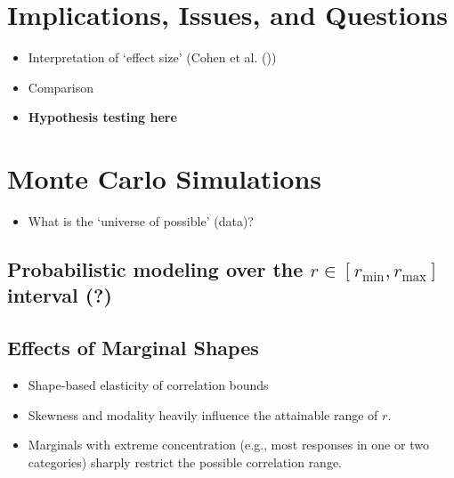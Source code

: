 \documentclass[
  12pt,
]{article}
\providecommand{\tightlist}{%
  \setlength{\itemsep}{0pt}\setlength{\parskip}{0pt}}\usepackage{longtable,booktabs,array}
\theoremstyle{plain}
\theoremstyle{definition}
\theoremstyle{remark}
\begin{document}
\section{Implications, Issues, and
Questions}\label{implications-issues-and-questions}

\begin{itemize}
\tightlist
\item
  Interpretation of `effect size' (Cohen et al.
  ())
\item
  Comparison
\item
  \textbf{Hypothesis testing here}
\end{itemize}

\section{Monte Carlo Simulations}\label{monte-carlo-simulations}

\begin{itemize}
\tightlist
\item
  What is the `universe of possible' (data)?
\end{itemize}

\subsection{\texorpdfstring{Probabilistic modeling over the
\(r \in [r_{\min}, r_{\max}]\) interval
(?)}{Probabilistic modeling over the r \textbackslash in {[}r\_\{\textbackslash min\}, r\_\{\textbackslash max\}{]} interval (?)}}\label{probabilistic-modeling-over-the-r-in-r_min-r_max-interval}

\subsection{Effects of Marginal
Shapes}\label{effects-of-marginal-shapes}

\begin{itemize}
\item
  Shape-based elasticity of correlation bounds\\
\item
  Skewness and modality heavily influence the attainable range of \(r\).
\item
  Marginals with extreme concentration (e.g., most responses in one or
  two categories) sharply restrict the possible correlation range.
\end{itemize}
\end{document}
